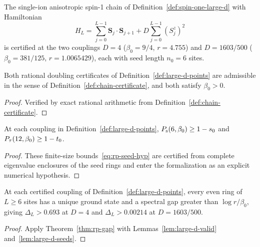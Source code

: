 \begin{definition}
  \label{def:large-d-points}
  \leanok
  The single-ion anisotropic spin-1 chain of Definition~\ref{def:spin-one-large-d} with Hamiltonian
  \begin{equation}
    \label{eq:large-d-ham}
    H_L = \sum_{j=0}^{L-1} \mathbf S_j \cdot \mathbf S_{j+1} + D \sum_{j=0}^{L-1} (S^z_j)^2
  \end{equation}
  is certified at the two couplings \(D = 4\) (\(\beta_0 = 9/4\), \(r = 4.755\)) and
  \(D = 1603/500\) (\(\beta_0 = 381/125\), \(r = 1.0065429\)), each with seed length \(n_0 = 6\)
  sites.
\end{definition}

\begin{lemma}
  \label{lem:large-d-valid}
  \leanok
  Both rational doubling certificates of Definition~\ref{def:large-d-points} are admissible in the
  sense of Definition~\ref{def:chain-certificate}, and both satisfy \(\beta_0 > 0\).
\end{lemma}
\begin{proof}
  \leanok
  Verified by exact rational arithmetic from Definition~\ref{def:chain-certificate}.
\end{proof}

\begin{lemma}
  \label{lem:large-d-seeds}
  \leanok
  At each coupling in Definition~\ref{def:large-d-points}, \(P_{\mathrm{s}}(6, \beta_0) \ge 1 - s_0\) and
  \(P_{\tau}(12, \beta_0) \ge 1 - t_0\).
\end{lemma}
\begin{proof}
  These finite-size bounds~\eqref{eq:rp-seed-hyp} are certified from complete eigenvalue enclosures
  of the seed rings and enter the formalization as an explicit numerical hypothesis.
\end{proof}

\begin{theorem}
  \label{thm:large-d-gap}
  \leanok
  At each certified coupling of Definition~\ref{def:large-d-points}, every even ring of \(L \ge 6\)
  sites has a unique ground state and a spectral gap greater than \(\log r / \beta_0\), giving
  \(\Delta_L > 0.693\) at \(D = 4\) and \(\Delta_L > 0.00214\) at \(D = 1603/500\).
\end{theorem}
\begin{proof}
  \leanok
  Apply Theorem~\ref{thm:rp-gap} with Lemmas~\ref{lem:large-d-valid} and~\ref{lem:large-d-seeds}.
\end{proof}

